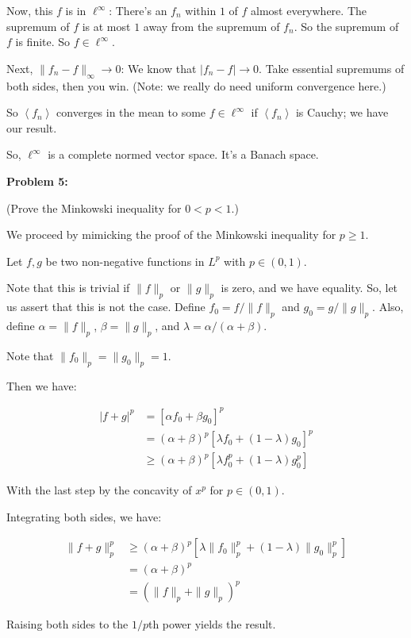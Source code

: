 \documentclass[a4paper,12pt]{article}
\newcommand{\tab}{\hspace{4mm}} %
\newcommand{\shunt}{\vspace{20mm}}
\newcommand{\absval}[1]{\left\lvert #1 \right\rvert}
\newcommand{\norm}[1]{\|#1\|}
\newcommand{\anbrack}[1]{\left\langle #1 \right\rangle}
\newcommand{\al}{\alpha} %
\newcommand{\be}{\beta}
\newcommand{\la}{\lambda}
\begin{document}
\tab Now, this $f$ is in $\ell^\infty$: There's an $f_n$ within $1$ of $f$ almost everywhere. The supremum of $f$ is at most $1$ away from the supremum of $f_n$. So the supremum of $f$ is finite. So $f \in \ell^\infty$.

\tab Next, $\norm{f_n - f}_\infty \to 0$:  We know that $\absval{f_n-f} \to 0$. Take essential supremums of both sides, then you win. (Note: we really do need uniform convergence here.)

\tab So $\anbrack{f_n}$ converges in the mean to some $f \in \ell^\infty$ if $\anbrack{f_n}$ is Cauchy; we have our result.


So, $\ell^\infty$ is a complete normed vector space. It's a Banach space.

\shunt

{\bf Problem 5:} 

(Prove the Minkowski inequality for $0 < p < 1$.)

We proceed by mimicking the proof of the Minkowski inequality for $p \geq 1$. 

Let $f,g$ be two non-negative functions in $L^p$ with $p \in (0,1)$.

Note that this is trivial if $\norm{f}_p$ or $\norm{g}_p$ is zero, and we have equality. So, let us assert that this is not the case. Define $f_0=f/\norm{f}_p$ and $g_0=g/\norm{g}_p$. Also, define $\al = \norm{f}_p$, $\be=\norm{g}_p$, and $\la = \al/(\al+\be)$.

Note that $\norm{f_0}_p=\norm{g_0}_p=1$.

Then we have:

\begin{align*}
\absval{f+g}^p &= [\al f_0 + \be g_0]^p\\
&= (\al+\be)^p[\la f_0 + (1-\la) g_0]^p\\
&\geq (\al+\be)^p[\la f_0^p + (1-\la) g_0^p]
\end{align*}

With the last step by the concavity of $x^p$ for $p \in (0,1)$.

Integrating both sides, we have:

\begin{align*}
\norm{f+g}_p^p &\geq (\al+\be)^p[\la \norm{f_0}_p^p+(1-\la)\norm{g_0}_p^p]\\
&=(\al+\be)^p\\
&=(\norm{f}_p+\norm{g}_p)^p
\end{align*}

Raising both sides to the $1/p$th power yields the result. 
\end{document}
